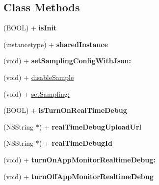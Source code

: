 \subsection*{Class Methods}
\begin{DoxyCompactItemize}
\item 
\mbox{\label{interface_app_monitor_ad784f79b8882dc39f146847fb1fb7c58}} 
(B\+O\+OL) + {\bfseries is\+Init}
\item 
\mbox{\label{interface_app_monitor_a8998cf299c9229340092bcf7e918a3e6}} 
(instancetype) + {\bfseries shared\+Instance}
\item 
\mbox{\label{interface_app_monitor_a2dc1e92a804ab13ba5a4a72ad4c3550c}} 
(void) + {\bfseries set\+Sampling\+Config\+With\+Json\+:}
\item 
(void) + \mbox{\hyperlink{interface_app_monitor_a20bd877ea45f47a4b2a1952b80be73ee}{disable\+Sample}}
\item 
(void) + \mbox{\hyperlink{interface_app_monitor_aa20ec8d80e9bd57158a485c1519a9547}{set\+Sampling\+:}}
\item 
\mbox{\label{interface_app_monitor_ae9f0233bc95672a41baa971a6bbe77f5}} 
(B\+O\+OL) + {\bfseries is\+Turn\+On\+Real\+Time\+Debug}
\item 
\mbox{\label{interface_app_monitor_a75de2032aa9969e9d69dd52e4da19531}} 
(N\+S\+String $\ast$) + {\bfseries real\+Time\+Debug\+Upload\+Url}
\item 
\mbox{\label{interface_app_monitor_abe93c9dcfd209703809f4123166ec515}} 
(N\+S\+String $\ast$) + {\bfseries real\+Time\+Debug\+Id}
\item 
\mbox{\label{interface_app_monitor_a277bb0afc4c1c2491a3c6d150f89a02c}} 
(void) + {\bfseries turn\+On\+App\+Monitor\+Realtime\+Debug\+:}
\item 
\mbox{\label{interface_app_monitor_a8f6a36613ff16afc12f5f5b28e1eebc0}} 
(void) + {\bfseries turn\+Off\+App\+Monitor\+Realtime\+Debug}
\end{DoxyCompactItemize}


